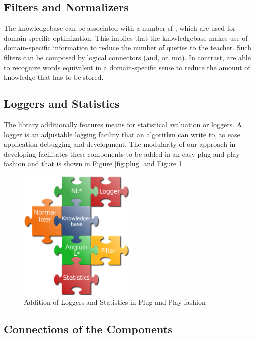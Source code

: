 \subsection{Filters and Normalizers}	
	The knowledgebase can be associated with a number of \filters, which are used for domain-specific optimization. This implies that the knowledgebase makes use of domain-specific information to reduce the number of queries to the teacher. Such filters can be composed by logical connectors (and, or, not). In contrast, \normalizers are able to recognize words equivalent in a domain-specific sense to reduce the amount of knowledge that has to be stored. 
		
\subsection{Loggers and Statistics}	
	The library additionally features means for statistical evaluation or loggers. A logger is an adjustable logging facility that an algorithm can write to, to ease application debugging and development. The modularity of our approach in developing \libalf facilitates these components to be added in an easy plug and play fashion and that is shown in Figure \ref{fig:plug} and Figure \ref{fig:loggers}.
	
\begin{figure}[h]
	\centering
	\includegraphics[width=0.5\textwidth]{Images/combined6.png}
	\caption{Addition of Loggers and Statistics in Plug and Play fashion}
	\label{fig:loggers}
\end{figure}
	
\subsection{Connections of the Components}

